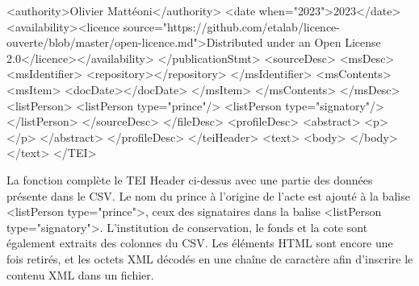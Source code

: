 <authority>Olivier Mattéoni</authority> \newline 
<date when="2023">2023</date> \newline 
<availability><licence source="https://github.com/etalab/licence-ouverte/blob/master/open-licence.md">Distributed under an Open License 2.0</licence></availability> \newline 
</publicationStmt> \newline 
<sourceDesc> \newline 
<msDesc> \newline 
<msIdentifier> \newline 
<repository></repository> \newline 
</msIdentifier> \newline 
<msContents> \newline 
<msItem> \newline 
<docDate></docDate> \newline 
</msItem> \newline 
</msContents> \newline 
</msDesc> \newline 
<listPerson> \newline 
<listPerson type="prince"/> \newline 
<listPerson type="signatory"/> \newline 
</listPerson> \newline 
</sourceDesc> \newline 
</fileDesc> \newline 
<profileDesc> \newline 
<abstract> 
<p></p> 
</abstract> \newline 
</profileDesc> \newline 
</teiHeader> \newline 
<text> \newline 
<body> \newline 
</body> \newline 
</text>
</TEI> \newline 

\par La fonction complète le TEI Header ci-dessus avec une partie des données présente dans le CSV. Le nom du prince à l'origine de l'acte est ajouté à la balise <listPerson type="prince">, ceux des signataires dans la balise <listPerson type="signatory">. L'institution de conservation, le fonds et la cote sont également extraits des colonnes du CSV. Les éléments HTML sont encore une fois retirés, et les octets XML décodés en une chaîne de caractère afin d'inscrire le contenu XML dans un fichier. 
\newline 

